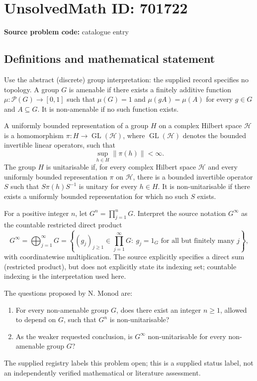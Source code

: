\documentclass[11pt]{article}
\begin{document}
\section*{UnsolvedMath ID: 701722}
\textbf{Source problem code:} catalogue entry
\subsection{Definitions and mathematical statement}
Use the abstract (discrete) group interpretation: the supplied record specifies no topology. A group \(G\) is amenable if there exists a finitely additive function \(\mu:\mathcal P(G)\to[0,1]\) such that \(\mu(G)=1\) and \(\mu(gA)=\mu(A)\) for every \(g\in G\) and \(A\subseteq G\). It is non-amenable if no such function exists.

A uniformly bounded representation of a group \(H\) on a complex Hilbert space \(\mathcal H\) is a homomorphism \(\pi:H\to\operatorname{GL}(\mathcal H)\), where \(\operatorname{GL}(\mathcal H)\) denotes the bounded invertible linear operators, such that
\[
\sup_{h\in H}\|\pi(h)\|<\infty.
\]
The group \(H\) is unitarisable if, for every complex Hilbert space \(\mathcal H\) and every uniformly bounded representation \(\pi\) on \(\mathcal H\), there is a bounded invertible operator \(S\) such that \(S\pi(h)S^{-1}\) is unitary for every \(h\in H\). It is non-unitarisable if there exists a uniformly bounded representation for which no such \(S\) exists.

For a positive integer \(n\), let \(G^n=\prod_{j=1}^{n}G\). Interpret the source notation \(G^{\infty}\) as the countable restricted direct product
\[
G^{\infty}=\bigoplus_{j=1}^{\infty}G
=\left\{(g_j)_{j\geq1}\in\prod_{j=1}^{\infty}G:\ g_j=1_G\text{ for all but finitely many }j\right\},
\]
with coordinatewise multiplication. The source explicitly specifies a direct sum (restricted product), but does not explicitly state its indexing set; countable indexing is the interpretation used here.

The questions proposed by N. Monod are:
\begin{enumerate}
\item[(a)] For every non-amenable group \(G\), does there exist an integer \(n\geq1\), allowed to depend on \(G\), such that \(G^n\) is non-unitarisable?
\item[(b)] As the weaker requested conclusion, is \(G^{\infty}\) non-unitarisable for every non-amenable group \(G\)?
\end{enumerate}
The supplied registry labels this problem open; this is a supplied status label, not an independently verified mathematical or literature assessment.
\end{document}
